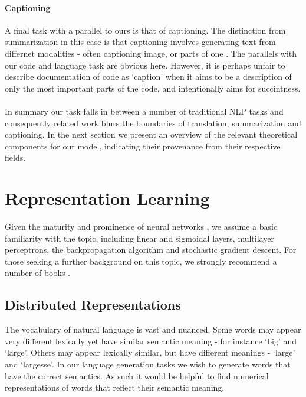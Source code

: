 \paragraph{Captioning}
A final task with a parallel to ours is that of captioning. 
The distinction from summarization in this case is that captioning involves generating text from differnet modalities - often captioning image, \citep{Vinyals2015ShowAT} or parts of one \citep{Karpathy2015DeepVA}.
The parallels with our code and language task are obvious here. However, it is perhaps unfair to describe documentation of code as `caption' when it aims to be a description of only the most important parts of the code, and intentionally aims for succintness.

\paragraph{}
In summary our task falls in between a number of traditional NLP tasks and consequently related work blurs the boundaries of translation, summarization and captioning. In the next section we present an overview of the relevant theoretical components for our model, indicating their provenance from their respective fields. 

\section{Representation Learning}

Given the maturity and prominence of neural networks 
, we assume a basic familiarity with the topic, including linear and sigmoidal layers, multilayer perceptrons, the backpropagation algorithm and stochastic gradient descent. For those seeking a further background on this topic, we strongly recommend a number of books \citet{nielsenneural,Goodfellow:2016:DL:3086952}. 



\subsection{Distributed Representations} %
\label{sub:embeddings}

The vocabulary of natural language is vast and nuanced. 
Some words may appear very different lexically yet have similar semantic meaning - for instance `big' and `large'.
Others may appear lexically similar, but have different meanings - `large' and `largesse'. 
In our language generation tasks we wish to generate words that have the correct semantics.
As such it would be helpful to find numerical representations of words that reflect their semantic meaning. 

